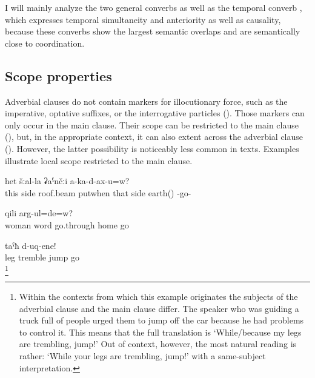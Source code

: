 I will mainly analyze the two general converbs as well as the temporal converb  , which expresses temporal simultaneity and anteriority as well as causality, because these converbs show the largest semantic overlaps and are semantically close to coordination.



\subsection{Scope properties}
\label{ssec:Scope properties}

Adverbial clauses do not contain markers for illocutionary force, such as the imperative, optative suffixes, or the interrogative particles (). Those markers can only occur in the main clause. Their scope can be restricted to the main clause (), but, in the appropriate context, it can also extent across the adverbial clause (). However, the latter possibility is noticeably less common in texts. Examples  illustrate local scope restricted to the main clause.
%
\begin{exe}
	\ex	\label{ex:When you put the roof beam at this (at one) side}
	\gll	[hej	šːal-li-cːe	cːiχːin	ka-b-alt-an=qːel]	het	šːal-la	ʡaˁnčːi	a-ka-d-ax-u=w?\\
		this	side	roof.beam	putwhen	that	side	earth()	-go-\\
	\glt	{}

	\ex	\label{ex:Do you go home because your wife told you to}
		qili	arg-ul=de=w?\\
			woman	word	go.through	home	go\\
	\glt	{}

	\ex	\label{ex:‎‎The legs are trembling, jump}
	\gll	[t'uˁ-me	rurčː-ul]	taˁħ	d-uq-ene!\\
		leg	tremble	jump	go\\
	\glt	{}\footnote{Within the contexts from which this example originates the subjects of the adverbial clause and the main clause differ. The speaker who was guiding a truck full of people urged them to jump off the car because he had problems to control it. This means that the full translation is `While/because my legs are trembling, jump!’ Out of context, however, the most natural reading is rather: `While your legs are trembling, jump!’ with a same-subject interpretation.}
\end{exe}

